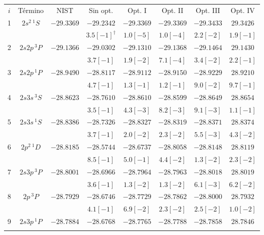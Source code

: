 \begin{table}
\centering
\begin{tabular}{*{8}{c}}
\rowcolor{mydarkgray} 
$i$ & Término & NIST 
  & Sin opt.    & Opt. I     & Opt. II    & Opt. III   & Opt. IV \\
1 & $2s^2\,^1S$ & $-29.3369$ 
  & $-29.2342$  & $-29.3369$ & $-29.3369$ & $-29.3433$ & $29.3426$ \\ \rowcolor{mygray} & & 
  & $3.5[-1]^\dagger$ & $1.0[-5]$ & $1.0[-4]$ & $2.2[-2]$ & $1.9[-1]$ \\ 
2 & $2s2p\,^3P$ & $-29.1366$ 
  & $-29.0302$  & $-29.1310$ & $-29.1368$ & $-29.1464$ & $29.1430$ \\ \rowcolor{mygray} & & 
  & $3.7[-1]$   & $1.9[-2]$  & $7.1[-4]$  & $3.4[-2]$  & $2.2[-1]$ \\ 
3 & $2s2p\,^1P$ & $-28.9490$ 
  & $-28.8117$  & $-28.9112$ & $-28.9150$ & $-28.9229$ & $28.9210$ \\ \rowcolor{mygray}  & & 
  & $4.7[-1]$   & $1.3[-1]$  & $1.2[-1]$  & $9.0[-2]$  & $9.7[-1]$ \\ 
4 & $2s3s\,^3S$ & $-28.8623$ 
  & $-28.7610$  & $-28.8610$ & $-28.8599$ & $-28.8649$ & $28.8654$ \\ \rowcolor{mygray}  & & 
  & $3.5[-1]$   & $4.3[-3]$  & $8.2[-3]$  & $9.1[-3]$  & $1.1[-1]$ \\ 
5 & $2s3s\,^1S$ & $-28.8386$ 
  & $-28.7326$  & $-28.8327$ & $-28.8319$ & $-28.8371$ & $28.8374$ \\ \rowcolor{mygray}  & & 
  & $3.7[-1]$   & $2.0[-2]$  & $2.3[-2]$  & $5.5[-3]$  & $4.3[-2]$ \\ 
6 & $2p^2\,^1D$ & $-28.8185$
  & $-28.5744$  & $-28.6737$ & $-28.8058$ & $-28.8148$ & $28.8119$ \\ \rowcolor{mygray}  & & 
  & $8.5[-1]$   & $5.0[-1]$  & $4.4[-2]$  & $1.3[-2]$  & $2.3[-2]$\\ 
7 & $2s3p\,^3P$ & $-28.8001$ 
  & $-28.6966$  & $-28.7964$ & $-28.7963$ & $-28.8018$ & $28.8019$ \\ \rowcolor{mygray}  & & 
  & $3.6[-1]$   & $1.3[-2]$  & $1.3[-2]$  & $6.1[-3]$  & $6.2[-2]$ \\  
8 & $2p\,^3P$   & $-28.7929$ 
  & $-28.6746$  & $-28.7729$ & $-28.7862$ & $-28.8000$ & $28.7932$ \\ \rowcolor{mygray}  & & 
  & $4.1[-1]$   & $6.9[-2]$  & $2.3[-2]$  & $2.5[-2]$  & $1.0[-2]$ \\  
9 & $2s3p\,^1P$ & $-28.7884$ 
  & $-28.6768$  & $-28.7765$ & $-28.7788$ & $-28.7858$ & $28.7846$ \\ \rowcolor{mygray}  & & 

\end{tabular}
\end{table}
